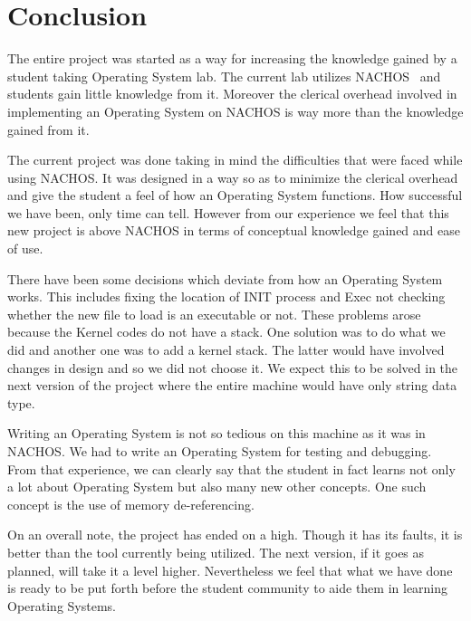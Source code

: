 \chapter{Conclusion}
\label{chp:conclusion}

The entire project was started as a way for increasing the knowledge gained by a student taking Operating System lab. The current lab utilizes NACHOS~\cite{nachos} and students gain little knowledge from it. Moreover the clerical overhead involved in implementing an Operating System on NACHOS is way more than the knowledge gained from it.

The current project was done taking in mind the difficulties that were faced while using NACHOS. It was designed in a way so as to minimize the clerical overhead and give the student a feel of how an Operating System functions. How successful we have been, only time can tell. However from our experience we feel that this new project is above NACHOS in terms of conceptual knowledge gained and ease of use.

There have been some decisions which deviate from how an Operating System works. This includes fixing the location of INIT process and Exec not checking whether the new file to load is an executable or not. These problems arose because the Kernel codes do not have a stack. One solution was to do what we did and another one was to add a kernel stack. The latter would have involved changes in design and so we did not choose it. We expect this to be solved in the next version of the project where the entire machine would have only string data type.

Writing an Operating System is not so tedious on this machine  as it was in NACHOS. We had to write an Operating System for testing and debugging. From that experience, we can clearly say that the student in fact learns not only a lot about Operating System but also many new other concepts. One such concept is the use of memory de-referencing.

On an overall note, the project has ended on a high. Though it has its faults, it is better than the tool currently being utilized. The next version, if it goes as planned, will take it a level higher. Nevertheless we feel that what we have done is ready to be put forth before the student community to aide them in learning Operating Systems.